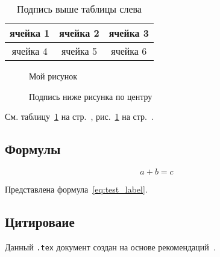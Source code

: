 \documentclass[14pt, a4paper, titlepage]{extarticle}
\begin{document}
\begin{table}[htb]
    \caption{Подпись выше таблицы слева}
    \begin{tabular}{ |c|c|c| } 
        \hline
        ячейка 1 & ячейка 2 & ячейка 3 \\ \hline
        ячейка 4 & ячейка 5 & ячейка 6 \\ \hline
    \end{tabular}
    \label{tab:test_label}
\end{table}
 
\begin{figure}[htb]
    \centering
    Мой рисунок
    \caption{Подпись ниже рисунка по центру}
    \label{fig:test_label}
\end{figure}
 
См. таблицу~\ref{tab:test_label} на стр.~\pageref{tab:test_label}, рис.~\ref{fig:test_label} на стр.~\pageref{fig:test_label}.

\subsection{Формулы}

\begin{equation}\label{eq:test_label}
    a+b=c
\end{equation}

Представлена формула~\ref{eq:test_label}.

\subsection{Цитироваие}

Данный \verb".tex" документ создан на основе рекомендаций~\parencite{bib:recomendations}.

\clearpage
{}
\printbibliography[title={Список использованных источников}]
\end{document}
